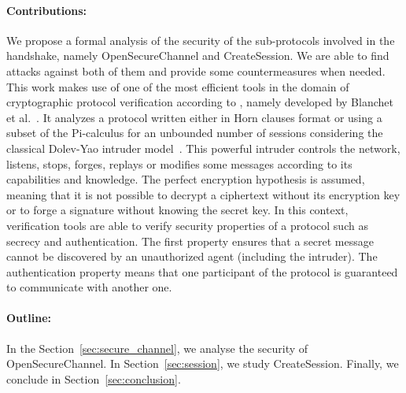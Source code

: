 \paragraph{Contributions:}

We propose a formal analysis of the security of
the sub-protocols involved in the \opcua handshake, namely \opcua
OpenSecureChannel and \opcua CreateSession.  We are able to find
attacks against both of them and provide some countermeasures when
needed.  This work makes use of one of the most efficient tools in the
domain of cryptographic protocol verification according
to \cite{LP15}, namely \proverif developed by Blanchet et al.~\cite{Bla01}.
It analyzes a protocol written either in Horn clauses format or using
a subset of the Pi-calculus for an unbounded number of sessions
considering the classical Dolev-Yao intruder model~\cite{DY81}.  This
powerful intruder controls the network, listens, stops, forges,
replays or modifies some messages according to its capabilities and
knowledge.  The perfect encryption hypothesis is assumed, meaning that
it is not possible to decrypt a ciphertext without its encryption key
or to forge a signature without knowing the secret key.  In this
context, verification tools are able to verify security properties of
a protocol such as secrecy and authentication.  The first property
ensures that a secret message cannot be discovered by an unauthorized
agent (including the intruder).  The authentication property means
that one participant of the protocol is guaranteed to communicate with
another one.

\paragraph{Outline:} In the Section~\ref{sec:secure_channel}, we analyse the
security of \opcua OpenSecureChannel. In Section~\ref{sec:session}, we study
\opcua CreateSession. Finally, we conclude in Section~\ref{sec:conclusion}.
